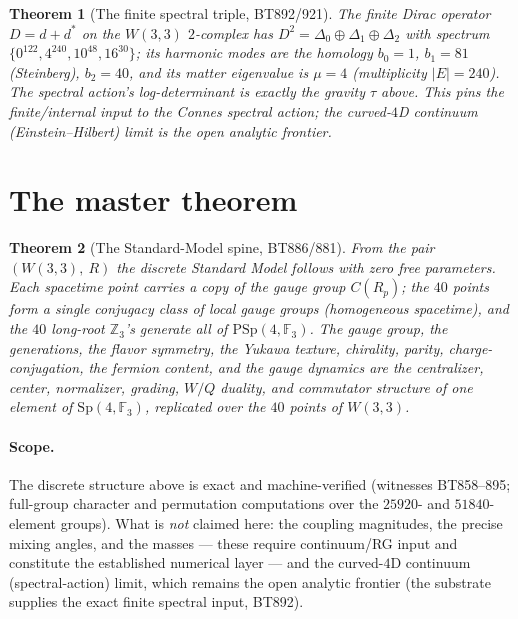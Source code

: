 \documentclass[11pt]{article}
\newtheorem{theorem}{Theorem}
\newcommand{\W}{W(3,3)}
\newcommand{\GF}[1]{\mathbb{F}_{#1}}
\newcommand{\Sp}{\mathrm{Sp}}
\newcommand{\PSp}{\mathrm{PSp}}
\newcommand{\Z}{\mathbb{Z}}
\begin{document}
\begin{theorem}[The finite spectral triple, BT892/921]
The finite Dirac operator $D=d+d^*$ on the $\W$ $2$-complex has
$D^2=\Delta_0\oplus\Delta_1\oplus\Delta_2$ with spectrum
$\{0^{122},4^{240},10^{48},16^{30}\}$; its harmonic modes are the
homology $b_0{=}1$, $b_1{=}81$ (Steinberg), $b_2{=}40$, and its
matter eigenvalue is $\mu=4$ (multiplicity $|E|=240$). The spectral
action's log-determinant is exactly the gravity $\tau$ above. This
pins the finite/internal input to the Connes spectral action; the
curved-$4$D continuum (Einstein--Hilbert) limit is the open analytic
frontier.
\end{theorem}

\section{The master theorem}
\begin{theorem}[The Standard-Model spine, BT886/881]
From the pair $(\W,\ R)$ the discrete Standard Model follows with zero
free parameters. Each spacetime point carries a copy of the gauge group
$C(R_p)$; the $40$ points form a single conjugacy class of local gauge
groups (homogeneous spacetime), and the $40$ long-root $\Z_3$'s generate
all of $\PSp(4,\GF3)$. The gauge group, the generations, the flavor
symmetry, the Yukawa texture, chirality, parity, charge-conjugation,
the fermion content, and the gauge dynamics are the centralizer, center,
normalizer, grading, $W/Q$ duality, and commutator structure of one
element of $\Sp(4,\GF3)$, replicated over the $40$ points of $\W$.
\end{theorem}

\paragraph{Scope.} The discrete structure above is exact and
machine-verified (witnesses BT858--895; full-group character and
permutation computations over the $25920$- and $51840$-element groups).
What is \emph{not} claimed here: the coupling magnitudes, the precise
mixing angles, and the masses --- these require continuum/RG input and
constitute the established numerical layer --- and the curved-$4$D
continuum (spectral-action) limit, which remains the open analytic
frontier (the substrate supplies the exact finite spectral input,
BT892).
\end{document}
